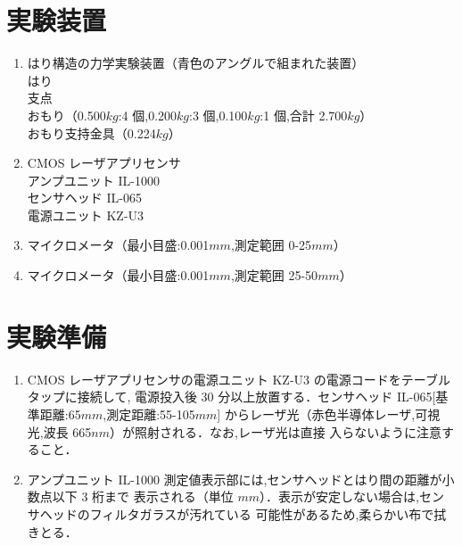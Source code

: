 \documentclass[a4paper,11pt]{jsarticle}
\begin{document}
\section{実験装置}
\begin{enumerate}
  \item はり構造の力学実験装置（青色のアングルで組まれた装置）\\
  はり\\
  支点\\
  おもり（0.500$kg$:4 個,0.200$kg$:3 個,0.100$kg$:1 個,合計 2.700$kg$）\\
  おもり支持金具（0.224$kg$）
  \item CMOS レーザアプリセンサ\\
  アンプユニット IL-1000\\
  センサヘッド IL-065\\
  電源ユニット KZ-U3
  \item マイクロメータ（最小目盛:0.001$mm$,測定範囲 0-25$mm$）
  \item マイクロメータ（最小目盛:0.001$mm$,測定範囲 25-50$mm$）
\end{enumerate}

\section{実験準備}
\begin{enumerate}
  \item CMOS レーザアプリセンサの電源ユニット KZ-U3 の電源コードをテーブルタップに接続して,
  電源投入後 30 分以上放置する．センサヘッド IL-065[基準距離:65$mm$,測定距離:55-105$mm$]
  からレーザ光（赤色半導体レーザ,可視光,波長 665$nm$）が照射される．なお,レーザ光は直接
  入らないように注意すること．
  \item アンプユニット IL-1000 測定値表示部には,センサヘッドとはり間の距離が小数点以下 3 桁まで
  表示される（単位 $mm$）．表示が安定しない場合は,センサヘッドのフィルタガラスが汚れている
  可能性があるため,柔らかい布で拭きとる．
\end{enumerate}
\end{document}
